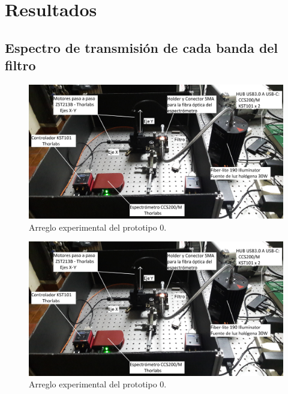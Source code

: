 \singlespacing
\section{Resultados}
\label{sec:resgrales}


\singlespacing
\subsection{Espectro de transmisión de cada banda del filtro}
\label{sec:espectransm}

\hspace{0.5cm}

\begin{figure}[H]
	\centering
	\includegraphics[width=1.0\textwidth]{Figs/microespectrometro/setupbarridooriginal.jpg}
	\caption{Arreglo experimental del prototipo 0.}
	\label{fig:setup0}
\end{figure}

\begin{figure}[H]
	\centering
	\includegraphics[width=1.0\textwidth]{Figs/microespectrometro/setupbarridooriginal.jpg}
	\caption{Arreglo experimental del prototipo 0.}
	\label{fig:setup0}
\end{figure}

